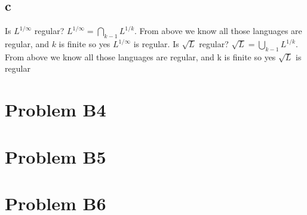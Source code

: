 \documentclass[12pt]{article}
\begin{document}
\subsection*{c}
Is $L^{1/\infty}$ regular? $L^{1/\infty} = \bigcap_{k-1}L^{1/k}$.  From above we know all those languages are regular, and $k$ is finite so yes $L^{1/\infty}$ is regular.\newline
Is $\sqrt{L}$ regular? $\sqrt{L} = \bigcup_{k-1}L^{1/k}$.  From above we know all those languages are regular, and k is finite so yes $\sqrt{L}$ is regular

\section*{Problem B4}

\section*{Problem B5}

\section*{Problem B6}
\end{document}
